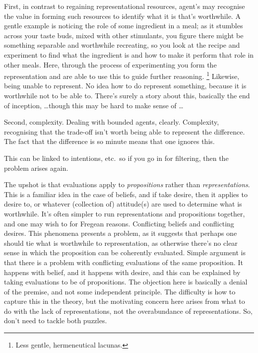 \documentclass[10pt]{article}
\begin{document}
First, in contrast to regaining representational resources, agent's may recognise the value in forming such resources to identify what it is that's worthwhile.
A gentle example is noticing the role of some ingredient in a meal; as it stumbles across your taste buds, mixed with other stimulants, you figure there might be something separable and worthwhile recreating, so you look at the recipe and experiment to find what the ingredient is and how to make it perform that role in other meals.
Here, through the process of experimenting you form the representation and are able to use this to guide further reasoning.\nolinebreak
\footnote{Less gentle, hermeneutical lacunas.}
Likewise, {\color{blue} being unable to represent.
  No idea how to do represent something, because it is worthwhile not to be able to.
  There's surely a story about this, basically the end of inception, \dots though this may be hard to make sense of \dots}

Second, complexity.
Dealing with bounded agents, clearly.
Complexity, recognising that the trade-off isn't worth being able to represent the difference.
The fact that the difference is so minute means that one ignores this.

This can be linked to intentions, etc.\ so if you go in for filtering, then the problem arises again.


The upshot is that evaluations apply to \emph{propositions} rather than \emph{representations}.
This is a familiar idea in the case of beliefs, and if take desire, then it applies to desire to, or whatever (collection of) attitude(s) are used to determine what is worthwhile.
It's often simpler to run representations and propositions together, and one may wish to for Fregean reasons.
Conflicting beliefs and conflicting desires.
This phenomena presents a problem, as it suggests that perhaps one should tie what is worthwhile to representation, as otherwise there's no clear sense in which the proposition can be coherently evaluated.
Simple argument is that there is a problem with conflicting evaluations of the same proposition.
It happens with belief, and it happens with desire, and this can be explained by taking evaluations to be of propositions.
The objection here is basically a denial of the premise, and not some independent principle.
The difficulty is how to capture this in the theory, but the motivating concern here arises from what to do with the lack of representations, not the overabundance of representations.
So, don't need to tackle both puzzles.
\end{document}
